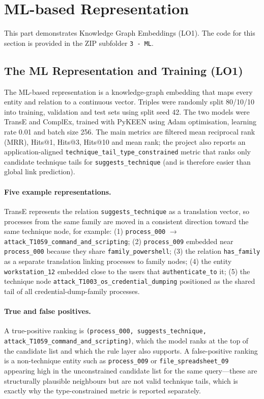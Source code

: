 \documentclass{article}
\begin{document}
\section{ML-based Representation}
This part demonstrates Knowledge Graph Embeddings (LO1). The code for this
section is provided in the ZIP subfolder \texttt{3 - ML}.

\subsection{The ML Representation and Training (LO1)}
The ML-based representation is a knowledge-graph embedding that maps every
entity and relation to a continuous vector. Triples were randomly split 80/10/10
into training, validation and test sets using split seed 42. The two models were
TransE and ComplEx, trained with PyKEEN using Adam optimisation, learning rate
0.01 and batch size 256. The main metrics are filtered mean reciprocal rank
(MRR), Hits@1, Hits@3, Hits@10 and mean rank; the project also reports an
application-aligned \texttt{technique\_tail\_type\_constrained} metric that ranks
only candidate technique tails for \texttt{suggests\_technique} (and is therefore
easier than global link prediction).

\paragraph{Five example representations.} TransE represents the relation
\texttt{suggests\_technique} as a translation vector, so processes from the same
family are moved in a consistent direction toward the same technique node, for
example: (1) \texttt{process\_000} $\to$
\texttt{attack\_T1059\_command\_and\_scripting}; (2) \texttt{process\_009}
embedded near \texttt{process\_000} because they share
\texttt{family\_powershell}; (3) the relation \texttt{has\_family} as a separate
translation linking processes to family nodes; (4) the entity
\texttt{workstation\_12} embedded close to the users that
\texttt{authenticate\_to} it; (5) the technique node
\texttt{attack\_T1003\_os\_credential\_dumping} positioned as the shared tail of
all credential-dump-family processes.

\paragraph{True and false positives.} A true-positive ranking is
\texttt{(process\_000, suggests\_technique, attack\_T1059\_command\_and\_scripting)},
which the model ranks at the top of the candidate list and which the rule layer
also supports. A false-positive ranking is a non-technique entity such as
\texttt{process\_009} or \texttt{file\_spreadsheet\_09} appearing high in the
unconstrained candidate list for the same query---these are structurally
plausible neighbours but are not valid technique tails, which is exactly why the
type-constrained metric is reported separately.
\end{document}
